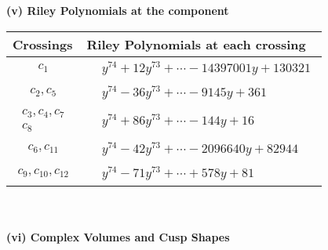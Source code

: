 \documentclass[1p]{elsarticle_modified}
\theoremstyle{definition}
\begin{document}
\newpage\renewcommand{\arraystretch}{1}
\flushleft \textbf{(v) Riley Polynomials at the component}\newline \\
\begin{tabular}{m{50pt}|m{274pt}}
Crossings & \hspace{64pt}Riley Polynomials at each crossing \\
\hline $$\begin{aligned}c_{1}\end{aligned}$$&$\begin{aligned}
&y^{74}+12 y^{73}+\cdots-14397001 y+130321
\end{aligned}$\\
\hline $$\begin{aligned}c_{2},c_{5}\end{aligned}$$&$\begin{aligned}
&y^{74}-36 y^{73}+\cdots-9145 y+361
\end{aligned}$\\
\hline $$\begin{aligned}c_{3},c_{4},c_{7}\\c_{8}\end{aligned}$$&$\begin{aligned}
&y^{74}+86 y^{73}+\cdots-144 y+16
\end{aligned}$\\
\hline $$\begin{aligned}c_{6},c_{11}\end{aligned}$$&$\begin{aligned}
&y^{74}-42 y^{73}+\cdots-2096640 y+82944
\end{aligned}$\\
\hline $$\begin{aligned}c_{9},c_{10},c_{12}\end{aligned}$$&$\begin{aligned}
&y^{74}-71 y^{73}+\cdots+578 y+81
\end{aligned}$\\
\hline
\end{tabular}\\~\\
\newpage\flushleft \textbf{(vi) Complex Volumes and Cusp Shapes}
\end{document}
